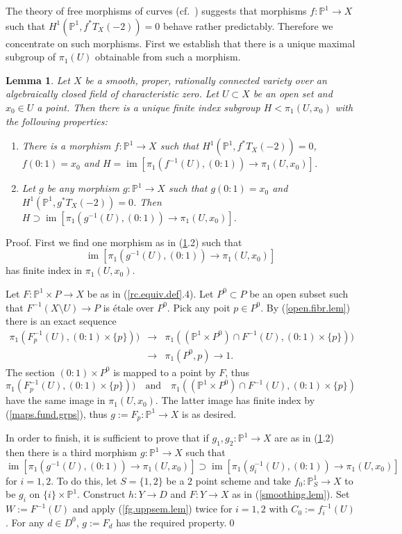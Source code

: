 \documentclass[12pt,twoside]{amsart}
\newcommand{\p}[0]{{\mathbb P}}
\newcommand{\qtq}[1]{\quad\mbox{#1}\quad}
\newcommand{\im}[0]{\operatorname{im}}
\newtheorem{lem}[thm]{Lemma}
\theoremstyle{definition}
\theoremstyle{remark}
\begin{document}
The theory of free morphisms of curves
(cf.\ \cite[II.3]{rcbook}) suggests that
 morphisms
$f:\p^1\to X$ such that $H^1(\p^1, f^*T_X(-2))=0$ behave rather predictably.
Therefore we concentrate on such morphisms. First we establish that
there is a unique maximal subgroup of $\pi_1(U)$ obtainable 
from such a morphism.


\begin{lem} \label{biggest.sg.lem}
Let $X$ be a smooth, proper, rationally connected variety
over an algebraically closed field of characteristic zero. Let
$U\subset X$ be an open set and $x_0\in U$ a point. Then there
is a unique finite index subgroup $H<  \pi_1(U,x_0)$
with the following properties:
\begin{enumerate}
\item There is  a morphism
$f:\p^1\to X$ such that $H^1(\p^1, f^*T_X(-2))=0$,
 $f(0{\colon\!} 1)=x_0$  and
$H=\im[\pi_1(f^{-1}(U),(0{\colon\!} 1))\to \pi_1(U,x_0)]$. 
\item Let $g$ be any morphism
$g:\p^1\to X$ such that $g(0{\colon\!} 1)=x_0$ and 
 $H^1(\p^1, g^*T_X(-2))=0$. Then
$H\supset \im[\pi_1(g^{-1}(U),(0{\colon\!} 1))\to \pi_1(U,x_0)]$. 
\end{enumerate}
\end{lem}

Proof.  First we find one morphism as in 
(\ref{biggest.sg.lem}.2) such that 
$$
\im[\pi_1(g^{-1}(U),(0{\colon\!} 1))\to \pi_1(U,x_0)]
$$
 has finite index in 
$\pi_1(U,x_0)$.


Let $F:\p^1\times P\to X$ be as in 
 (\ref{rc.equiv.def}.4). 
Let $P^0\subset P$ be an open subset such that
$F^{-1}(X\setminus U)\to P$ is \'etale over $P^0$. 
Pick any poit $p\in P^0$. 
By
(\ref{open.fibr.lem}) there is an exact sequence
$$
\begin{array}{lll}
\pi_1(F_p^{-1}(U), (0{\colon\!} 1)\times \{p\}))
&\to & \pi_1((\p^1\times P^0)\cap F^{-1}(U), (0{\colon\!} 1)\times \{p\}))\\
& \to &\pi_1(P^0,p)\to 1.
\end{array}
$$
The section $(0{\colon\!} 1)\times P^0$ is mapped to  a point by $F$,
thus
$$
\pi_1(F_p^{-1}(U), (0{\colon\!} 1)\times \{p\}))\qtq{and}
\pi_1((\p^1\times P^0)\cap F^{-1}(U), (0{\colon\!} 1)\times \{p\})
$$
have the same image in $\pi_1(U,x_0)$. The latter image has finite index
by (\ref{maps.fund.grps}), thus $g:=F_p:\p^1\to X$
is as desired.

In order to finish, it is sufficient to prove
that if  $g_1, g_2:\p^1\to X$ are as in (\ref{biggest.sg.lem}.2)
then there is a third morphism
$g:\p^1\to X$ such that
$$
\im[\pi_1(g^{-1}(U),(0{\colon\!} 1))\to \pi_1(U,x_0)]\supset
\im[\pi_1(g_i^{-1}(U),(0{\colon\!} 1))\to \pi_1(U,x_0)]
$$
for $i=1,2$. 
To do this, let $S=\{1,2\}$ be a 2 point scheme
and take $f_0:\p^1_S\to X$ to be $g_i$ on $\{i\}\times \p^1$. 
Construct $h:Y\to D$ and $F:Y\to X$ as in (\ref{smoothing.lem}).
Set $W:=F^{-1}(U)$ and apply (\ref{fg.uppsem.lem}) twice 
for $i=1,2$ 
with $C_0:=f_i^{-1}(U)$.
For any $d\in D^0$,  $g:=F_d$ has the required property.\qed
\end{document}
